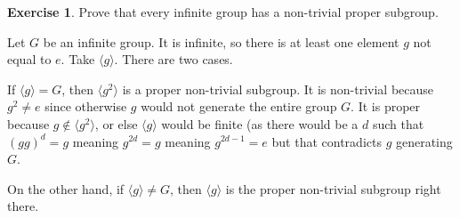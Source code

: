 \documentclass[11pt,oneside]{article}
\numberwithin{equation}{section}
\theoremstyle{definition}
\newtheorem{exercise}{Exercise}
\begin{document}
\begin{exercise}
  Prove that every infinite group has a non-trivial proper subgroup.
\end{exercise}

\begin{solution}
  Let $G$ be an infinite group.  It is infinite, so there is at least
  one element $g$ not equal to $e$.  Take $ \langle g \rangle$.  There
  are two cases.

  If $ \langle g \rangle = G $, then $ \langle g ^ 2
  \rangle $ is a proper non-trivial subgroup.  It is non-trivial
  because $g ^2 \neq e$ since otherwise $g$ would not generate the
  entire group $G$.  It is proper because $ g \notin \langle g ^ 2 \rangle $,
  or else $ \langle g \rangle $ would be finite (as there would be
  a $d$ such that $ ( g g) ^ d = g$ meaning $ g ^ {2 d} = g$ meaning $
  g ^ { 2d - 1 } = e $ but that contradicts $g$ generating $G$.

  On the other hand, if $ \langle g \rangle \neq G$, then $ \langle g \rangle $ is the
  proper non-trivial subgroup right there.  
  

\end{solution}

\begin{comment}
\begin{exercise}
  problem
\end{exercise}
\begin{solution}
\begin{enumerate}[(a)]
\item
  first answer
\end{enumerate}
\end{solution}
\end{comment}
\end{document}
